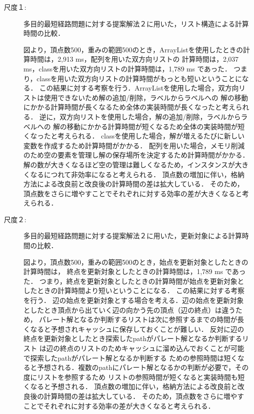\documentclass[12pt]{optlab-bachelor}
\begin{document}
\begin{description}
  \item[尺度１:]
  多目的最短経路問題に対する提案解法２に用いた，リスト構造による計算時間の比較．

  図より，頂点数500，重みの範囲500のとき，ArrayListを使用したときの計算時間は，2,913 ms，配列を用いた双方向リストの
  計算時間は，2,037 ms，classを用いた双方向リストの計算時間は，1,789 ms であった．
  つまり，classを用いた双方向リストの計算時間がもっとも短いということになる．
  この結果に対する考察を行う．ArrayListを使用した場合，双方向リストは使用できないため解の追加/削除，ラベルからラベルへの
  解の移動にかかる計算時間が長くなるため全体の実装時間が長くなったと考えられる．
  逆に，双方向リストを使用した場合，解の追加/削除，ラベルからラベルへの
  解の移動にかかる計算時間が短くなるため全体の実装時間が短くなったと考えられる．
  classを使用した場合，解が増えるたびに新しい変数を作成するため計算時間がかかる．
  配列を用いた場合，メモリ削減のため空の要素を管理し解の保存場所を決定するため計算時間がかかる．
  解の数が大きくなるほど空の管理は難しくなるため，インスタンスが大きくなるにつれて非効率になると考えられる．
  頂点数の増加に伴い，格納方法による改良前と改良後の計算時間の差は拡大している．
  そのため，頂点数をさらに増やすことでそれぞれに対する効率の差が大きくなると考えられる．

\end{description}

\begin{description}
  \item[尺度２:]
  多目的最短経路問題に対する提案解法２に用いた，更新対象による計算時間の比較．

  図より，頂点数500，重みの範囲500のとき，始点を更新対象としたときの計算時間は，
  終点を更新対象としたときの計算時間は，1,789 ms であった．
  つまり，終点を更新対象としたときの計算時間が始点を更新対象としたときの計算時間より短いということになる．
  この結果に対する考察を行う．
  辺の始点を更新対象とする場合を考える．辺の始点を更新対象としたとき頂点から出ていく辺の向かう先の頂点（辺の終点）は違うため，
  パレート解となるか判断するリストは次に参照するまでの時間が長くなると予想されキャッシュに保存しておくことが難しい．
  反対に辺の終点を更新対象としたとき探索したpathがパレート解となるか判断するリスト
  は辺の終点のリストのためキャッシュに溜め込んでおくことが可能で探索したpathがパレート解となるか判断する
  ための参照時間は短くなると予想される．複数のpathにパレート解となるかの判断が必要で，その度にリストを参照するため
  リストの参照時間が短くなると実装時間も短くなると予想される．
  頂点数の増加に伴い，格納方法による改良前と改良後の計算時間の差は拡大している．
  そのため，頂点数をさらに増やすことでそれぞれに対する効率の差が大きくなると考えられる．

\end{description}
\end{document}
